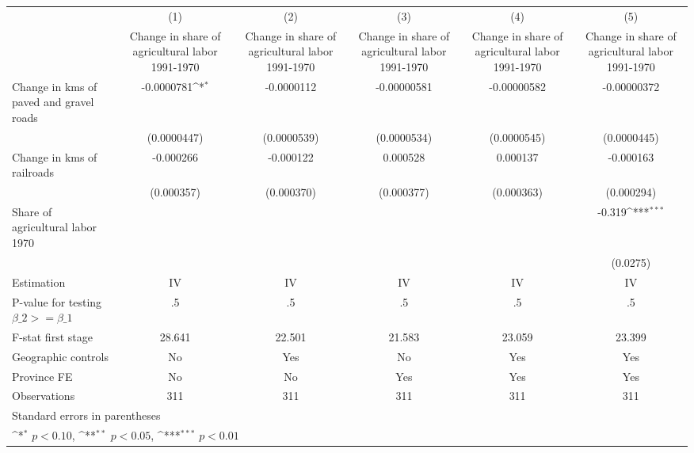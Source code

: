 {
\def\sym#1{\ifmmode^{#1}\else\(^{#1}\)\fi}
\begin{tabular}{l*{5}{c}}
\hline\hline
                    &\multicolumn{1}{c}{(1)}&\multicolumn{1}{c}{(2)}&\multicolumn{1}{c}{(3)}&\multicolumn{1}{c}{(4)}&\multicolumn{1}{c}{(5)}\\
                    &\multicolumn{1}{c}{Change in share of agricultural labor 1991-1970}&\multicolumn{1}{c}{Change in share of agricultural labor 1991-1970}&\multicolumn{1}{c}{Change in share of agricultural labor 1991-1970}&\multicolumn{1}{c}{Change in share of agricultural labor 1991-1970}&\multicolumn{1}{c}{Change in share of agricultural labor 1991-1970}\\
\hline
Change in kms of paved and gravel roads&  -0.0000781\sym{*}  &  -0.0000112         & -0.00000581         & -0.00000582         & -0.00000372         \\
                    & (0.0000447)         & (0.0000539)         & (0.0000534)         & (0.0000545)         & (0.0000445)         \\
[1em]
Change in kms of railroads&   -0.000266         &   -0.000122         &    0.000528         &    0.000137         &   -0.000163         \\
                    &  (0.000357)         &  (0.000370)         &  (0.000377)         &  (0.000363)         &  (0.000294)         \\
[1em]
Share of agricultural labor 1970&                     &                     &                     &                     &      -0.319\sym{***}\\
                    &                     &                     &                     &                     &    (0.0275)         \\
\hline
Estimation          &          IV         &          IV         &          IV         &          IV         &          IV         \\
P-value for testing $\beta\_2 >= \beta\_1$&          .5         &          .5         &          .5         &          .5         &          .5         \\
F-stat first stage  &      28.641         &      22.501         &      21.583         &      23.059         &      23.399         \\
Geographic controls &          No         &         Yes         &          No         &         Yes         &         Yes         \\
Province FE         &          No         &          No         &         Yes         &         Yes         &         Yes         \\
Observations        &         311         &         311         &         311         &         311         &         311         \\
\hline\hline
\multicolumn{6}{l}{\footnotesize Standard errors in parentheses}\\
\multicolumn{6}{l}{\footnotesize \sym{*} \(p<0.10\), \sym{**} \(p<0.05\), \sym{***} \(p<0.01\)}\\
\end{tabular}
}

